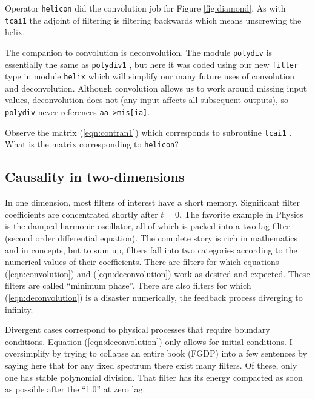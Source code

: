 \par
Operator {\tt helicon} did the convolution job for Figure \ref{fig:diamond}.
As with
\texttt{tcai1} 
the adjoint of filtering is filtering backwards
which means unscrewing the helix.

\par
The companion to convolution is deconvolution.
The module \texttt{polydiv} 
is essentially the same as
\texttt{polydiv1} ,
but here it was coded using
our new \texttt{filter} type in
module \texttt{helix} 
which will simplify our many future uses of
convolution and deconvolution.
Although convolution allows us to work around missing input values,
deconvolution does not
(any input affects all subsequent outputs),
so \texttt{polydiv} never references \verb#aa->mis[ia]#.

\begin{exer}
\item
Observe the matrix (\ref{eqn:contran1})
which corresponds to
subroutine
\texttt{tcai1} .
What is the matrix corresponding to
\texttt{helicon}? %
\end{exer}

\subsection{Causality in two-dimensions}
In one dimension, most filters of interest have a short memory.
Significant filter coefficients are concentrated shortly after $t=0$.
The favorite example in Physics is the
damped harmonic oscillator,
all of which is packed into a two-lag filter
(second order differential equation).
The complete story is rich in mathematics and in concepts,
but to sum up, filters fall into two categories according to the
numerical values of their coefficients.
There are filters for which equations
(\ref{eqn:convolution}) and
(\ref{eqn:deconvolution})
work as desired and expected.
These filters are called ``minimum phase''.
There are also filters for which
(\ref{eqn:deconvolution}) is a disaster numerically,
the feedback process diverging to infinity.

\par
Divergent cases correspond to physical processes
that require boundary conditions.
Equation (\ref{eqn:deconvolution})
only allows for initial conditions.
I oversimplify by trying to collapse an entire book (FGDP)
into a few sentences by saying here that
for any fixed spectrum
there exist many filters.
Of these, only one has
stable polynomial division.
That filter has its energy compacted
as soon as possible after the ``1.0'' at zero lag.

